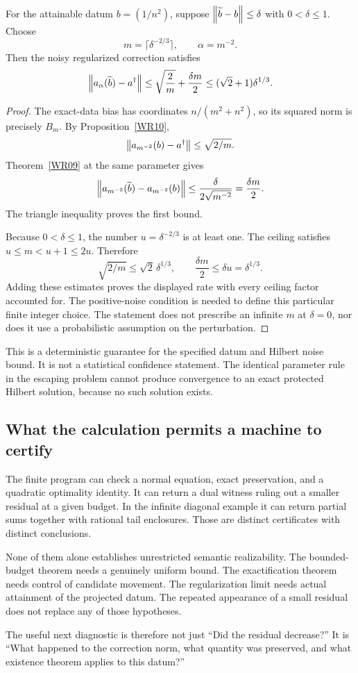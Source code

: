 \begin{corollary}\label{WR12}
For the attainable datum $b=(1/n^2)$, suppose $\left\lVert\widetilde b-b\right\rVert\le\delta$ with $0<\delta\le1$. Choose
\[
 m=\lceil\delta^{-2/3}\rceil,\qquad\alpha=m^{-2}.
\]
Then the noisy regularized correction satisfies
\[
 \left\lVert a_\alpha(\widetilde b)-a^\dagger\right\rVert
 \le\sqrt{\frac2m}+\frac{\delta m}{2}
 \le(\sqrt2+1)\delta^{1/3}.
\]
\end{corollary}
\begin{proof}
The exact-data bias has coordinates $n/(m^2+n^2)$, so its squared norm is precisely $B_m$. By Proposition~\ref{WR10},
\[
 \left\lVert a_{m^{-2}}(b)-a^\dagger\right\rVert\le\sqrt{2/m}.
\]
Theorem~\ref{WR09} at the same parameter gives
\[
 \left\lVert a_{m^{-2}}(\widetilde b)-a_{m^{-2}}(b)\right\rVert
 \le\frac{\delta}{2\sqrt{m^{-2}}}=\frac{\delta m}{2}.
\]
The triangle inequality proves the first bound.

Because $0<\delta\le1$, the number $u=\delta^{-2/3}$ is at least one. The ceiling satisfies $u\le m<u+1\le2u$. Therefore
\[
 \sqrt{2/m}\le\sqrt2\,\delta^{1/3},
 \qquad \frac{\delta m}{2}\le\delta u=\delta^{1/3}.
\]
Adding these estimates proves the displayed rate with every ceiling factor accounted for. The positive-noise condition is needed to define this particular finite integer choice. The statement does not prescribe an infinite $m$ at $\delta=0$, nor does it use a probabilistic assumption on the perturbation.
\end{proof}

This is a deterministic guarantee for the specified datum and Hilbert noise bound. It is not a statistical confidence statement. The identical parameter rule in the escaping problem cannot produce convergence to an exact protected Hilbert solution, because no such solution exists.

\subsection{What the calculation permits a machine to certify}
The finite program can check a normal equation, exact preservation, and a quadratic optimality identity. It can return a dual witness ruling out a smaller residual at a given budget. In the infinite diagonal example it can return partial sums together with rational tail enclosures. Those are distinct certificates with distinct conclusions.

None of them alone establishes unrestricted semantic realizability. The bounded-budget theorem needs a genuinely uniform bound. The exactification theorem needs control of candidate movement. The regularization limit needs actual attainment of the projected datum. The repeated appearance of a small residual does not replace any of those hypotheses.

The useful next diagnostic is therefore not just ``Did the residual decrease?'' It is ``What happened to the correction norm, what quantity was preserved, and what existence theorem applies to this datum?''
